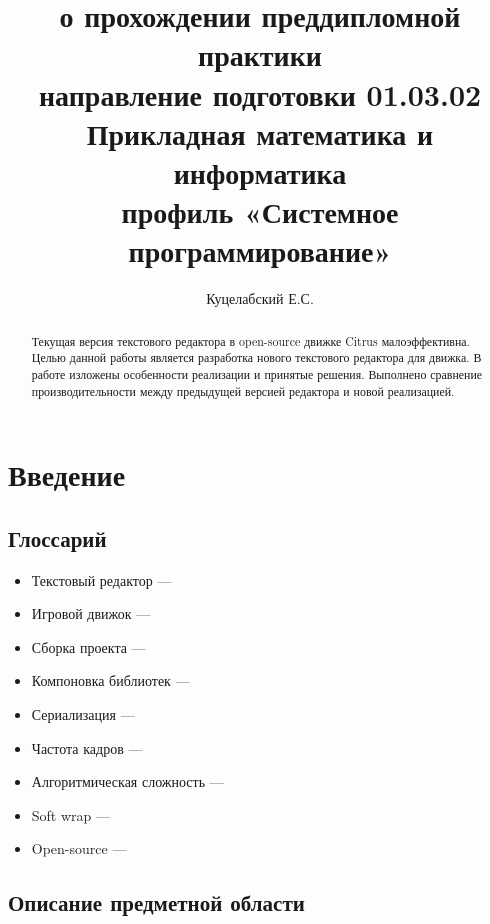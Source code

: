 \documentclass{fefu}
\begin{document}
	\title{о прохождении преддипломной практики\\направление подготовки 01.03.02 
	Прикладная математика и информатика\\профиль «Системное программирование»}
	\author{Куцелабский Е.С.}
	
	\makereporttitle
	\tableofcontents
	\newpage
	
	\begin{abstract}
		\par Текущая версия текстового редактора в open-source движке Citrus малоэффективна.
		Целью данной работы является разработка нового текстового редактора для 
		движка. В работе изложены особенности реализации и принятые решения.
		Выполнено сравнение производительности между предыдущей версией редактора и
		новой реализацией.
	\end{abstract}

	\section{Введение}
		\subsection{Глоссарий}
			\begin{itemize}
				\item Текстовый редактор ---
				\item Игровой движок --- 
				\item Сборка проекта ---
				\item Компоновка библиотек ---
				\item Сериализация ---
				\item Частота кадров ---
				\item Алгоритмическая сложность ---
				\item Soft wrap ---
				\item Open-source --- 
			\end{itemize}
		\subsection{Описание предметной области}
\end{document}

